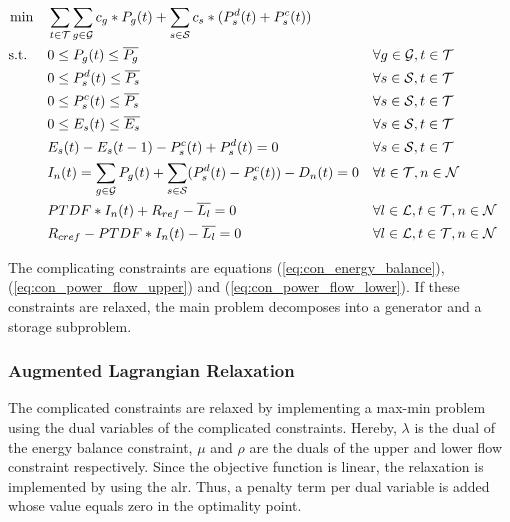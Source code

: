 \begin{subequations}
	\begin{align}
		 \min \quad & \sum_{t\in\mathcal{T}}\sum_{g\in\mathcal{G}}c_g*P_g(t) + \sum_{s\in\mathcal{S}}c_s*(P_s^d(t)+P_s^c(t))\\
		 \text{s.t. } \quad & 0 \leq P_g(t) \leq \overline{P_g} && \forall g \in \mathcal{G}, t \in \mathcal{T}\\\
		 & 0 \leq P_s^d(t) \leq \overline{P_s} && \forall s \in \mathcal{S}, t \in \mathcal{T}\\
		 & 0 \leq P_s^c(t) \leq \overline{P_s} && \forall s \in \mathcal{S}, t \in \mathcal{T}\\
		 & 0 \leq E_s(t) \leq \overline{E_s} && \forall s \in \mathcal{S}, t \in \mathcal{T}\\
		 & E_s(t) - E_s(t-1) - P_s^c(t) + P_s^d(t) = 0 && \forall s \in \mathcal{S}, t \in \mathcal{T}\\
		 & I_n(t) = \sum_{g\in\mathcal{G}}P_g(t) + \sum_{s\in\mathcal{S}}(P_s^d(t)-P_s^c(t))-D_n(t) = 0 && \forall t \in \mathcal{T}, n \in \mathcal{N} \label{eq:con_energy_balance}\\
		 & PTDF * I_n(t) + R_{ref} - \overline{L_l} = 0 && \forall l \in \mathcal{L}, t \in \mathcal{T}, n \in \mathcal{N} \label{eq:con_power_flow_upper} \\
		 & R_{cref} - PTDF * I_n(t) - \overline{L_l} = 0 && \forall l \in \mathcal{L}, t \in \mathcal{T}, n \in \mathcal{N} \label{eq:con_power_flow_lower}
	\end{align}
\end{subequations}

The complicating constraints are equations (\ref{eq:con_energy_balance}), (\ref{eq:con_power_flow_upper}) and (\ref{eq:con_power_flow_lower}). If these constraints are relaxed, the main problem decomposes into a generator and a storage subproblem.

\subsubsection{Augmented Lagrangian Relaxation}

The complicated constraints are relaxed by implementing a max-min problem using the dual variables of the complicated constraints. Hereby, $\lambda$ is the dual of the energy balance constraint, $\mu$ and $\rho$ are the duals of the upper and lower flow constraint respectively. Since the objective function is linear, the relaxation is implemented by using the \gls{alr}. Thus, a penalty term per dual variable is added whose value equals zero in the optimality point. 

